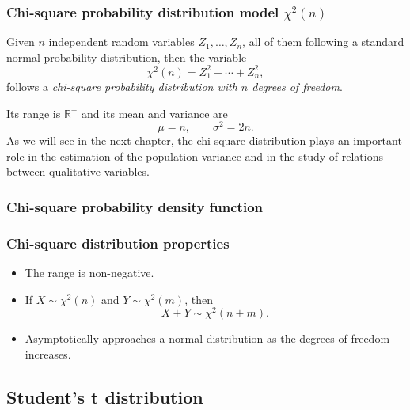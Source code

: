 \begin{frame}
\frametitle{Chi-square probability distribution model $\chi^2(n)$}
\begin{definition}
Given $n$ independent random variables $Z_1,\ldots,Z_n$, all of them following a standard normal probability
distribution, then the variable
\[
\chi^2(n) = Z_1^2+\cdots +Z_n^2,
\]
follows a \emph{chi-square probability distribution with $n$ degrees of freedom}.
\end{definition}

Its range is $\mathbb{R}^+$ and its mean and variance are
\[
\mu = n, \qquad \sigma^2 = 2n.
\]
As we will see in the next chapter, the chi-square distribution plays an important role in the estimation of the
population variance and in the study of relations between qualitative variables.
\end{frame}


\begin{frame}
\frametitle{Chi-square probability density function}

\begin{center}
\end{center}
\end{frame}


\begin{frame}
\frametitle{Chi-square distribution properties}
\begin{itemize}
\item The range is non-negative.
\item If $X\sim \chi^2(n)$ and $Y\sim \chi^2(m)$, then
\[
X+Y \sim \chi^2(n+m).
\]
\item Asymptotically approaches a normal distribution as the degrees of freedom increases. 
\end{itemize}
\end{frame}


\subsection{Student's t distribution}

